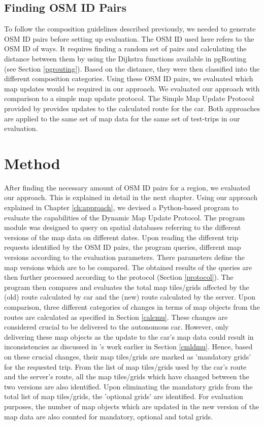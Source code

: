 \subsection{Finding OSM ID Pairs} \label{finding}
To follow the composition guidelines described previously, we needed to generate OSM ID pairs before setting up evaluation. The OSM ID used here refers to the OSM ID of ways. It requires finding a random set of pairs and calculating the distance between them by using the Dijkstra functions available in pgRouting (see Section \ref{pgrouting}). Based on the distance, they were then classified into the different composition categories. Using these OSM ID pairs, we evaluated which map updates would be required in our approach. We evaluated our approach with comparison to a simple map update protocol. The Simple Map Update Protocol provided by \citet{bastiaensen2003actmap} provides updates to the calculated route for the car. Both approaches are applied to the same set of map data for the same set of test-trips in our evaluation.  
\section{Method} \label{methodofapproach}
After finding the necessary amount of OSM ID pairs for a region, we evaluated our approach. This is explained in detail in the next chapter. Using our approach explained in Chapter \ref{ch:approach}, we devised a Python-based program to evaluate the capabilities of the Dynamic Map Update Protocol. The program module was designed to query on spatial databases referring to the different versions of the map data on different dates. Upon reading the different trip requests identified by the OSM ID pairs, the program queries, different map versions according to the evaluation parameters. There parameters define the map versions which are to be compared. The obtained results of the queries are then further processed according to the protocol (Section \ref{protocol}). The program then compares and evaluates the total map tiles/grids affected by the (old) route calculated by car and the (new) route calculated by the server. Upon comparison, three different categories of changes in terms of map objects from the routes are calculated as specified in Section \ref{calcmu}. These changes are considered crucial to be delivered to the autonomous car. However, only delivering these map objects as the update to the car's map data could result in inconsistencies as discussed in \citet{asahara2008locally}'s work earlier in Section \ref{cmldmu}. Hence, based on these crucial changes, their map tiles/grids are marked as 'mandatory grids' for the requested trip. From the list of map tiles/grids used by the car's route and the server's route, all the map tiles/grids which have changed between the two versions are also identified. Upon eliminating the mandatory grids from the total list of map tiles/grids, the 'optional grids' are identified. For evaluation purposes, the number of map objects which are updated in the new version of the map data are also counted for mandatory, optional and total grids. \\


